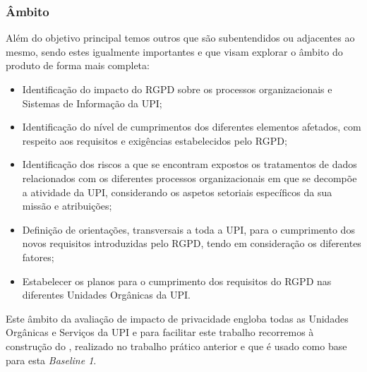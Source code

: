 \subsubsection{Âmbito}
Além do objetivo principal temos outros que são subentendidos ou adjacentes ao mesmo, sendo estes igualmente importantes e que visam explorar o âmbito do produto de forma mais completa:

\begin{itemize}
    \item Identificação do impacto do RGPD sobre os processos organizacionais e Sistemas de Informação da UPI;
    \item Identificação do nível de cumprimentos dos diferentes elementos afetados, com respeito aos requisitos e exigências estabelecidos pelo RGPD;
    \item Identificação dos riscos a que se encontram expostos os tratamentos de dados relacionados com os diferentes processos organizacionais em que se decompõe a atividade da UPI, considerando os aspetos setoriais específicos da sua missão e atribuições;
    \item Definição de orientações, transversais a toda a UPI, para o cumprimento dos novos requisitos introduzidas pelo RGPD, tendo em consideração os diferentes fatores;
    \item Estabelecer os planos para o cumprimento dos requisitos do RGPD nas diferentes Unidades Orgânicas da UPI.
\end{itemize}


Este âmbito da avaliação de impacto de privacidade engloba todas as Unidades Orgânicas e Serviços da UPI e para facilitar este trabalho recorremos à construção do , realizado no trabalho prático anterior e que é usado como base para esta \emph{Baseline 1}.

